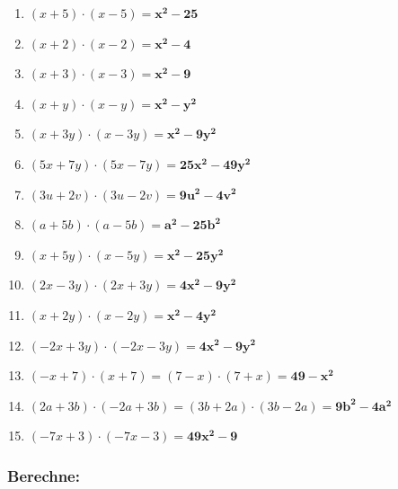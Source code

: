\documentclass[a4paper,10pt]{article} %
\begin{document}
\begin{enumerate}[label=\alph*)]

  \item \((x + 5) \cdot (x - 5) =
    \mathbf{x^2 - 25}\) %

  \item \((x + 2) \cdot (x - 2) =
    \mathbf{x^2 - 4}\) %

  \item \((x + 3) \cdot (x - 3) =
    \mathbf{x^2 - 9}\) %

  \item \((x + y) \cdot (x - y) =
    \mathbf{x^2 - y^2}\) %

  \item \((x + 3y) \cdot (x - 3y) =
    \mathbf{x^2 - 9y^2}\) %

  \item \((5x + 7y) \cdot (5x - 7y) =
    \mathbf{25x^2 - 49y^2}\) %

  \item \((3u + 2v) \cdot (3u - 2v) =
    \mathbf{9u^2 - 4v^2}\) %

  \item \((a + 5b) \cdot (a - 5b) =
    \mathbf{a^2 - 25b^2}\) %

  \item \((x + 5y) \cdot (x - 5y) =
    \mathbf{x^2 - 25y^2}\) %

  \item \((2x - 3y) \cdot (2x + 3y) =
    \mathbf{4x^2 - 9y^2}\) %

  \item \((x + 2y) \cdot (x - 2y) =
    \mathbf{x^2 - 4y^2}\) %

  \item \((-2x + 3y) \cdot (-2x - 3y) =
    \mathbf{4x^2 - 9y^2}\) %

  \item \((-x + 7) \cdot (x + 7) =
    (7 - x) \cdot (7 + x) =
    \mathbf{49 - x^2}\) %

  \item \((2a + 3b) \cdot (-2a + 3b) =
    (3b + 2a) \cdot (3b - 2a) =
    \mathbf{9b^2 - 4a^2}\) %

  \item \((-7x + 3) \cdot (-7x - 3) =
    \mathbf{49x^2 - 9}\) %

\end{enumerate}

\subsubsection{Berechne:} %
\end{document}
